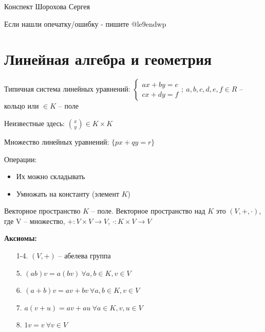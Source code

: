 \documentclass[12pt]{article}
\begin{document}
\begin{flushright}
    Конспект Шорохова Сергея

    Если нашли опечатку/ошибку - пишите @le9endwp
\end{flushright}

\tableofcontents
\newpage

\section{Линейная алгебра и геометрия}

Типичная система линейных уравнений: $\left\{\begin{array}{l}
    ax + by = e \\
    cx + dy = f
\end{array}\right.;\ a, b, c, d, e, f \in R$ -- кольцо или $\in K$ -- поле

Неизвестные здесь: ${x \choose y} \in K \times K$

Множество линейных уравнений: $\{ px + qy = r \}$

Операции:

\begin{itemize}
    \item Их можно складывать
    \item Умножать на константу (элемент $K$)
\end{itemize}

\vspace{5mm}

\begin{defin}{Векторное пространство}
    $K$ -- поле. Векторное пространство над $K$ это $(V, +, \cdot)$, где V -- множество, $+: V \times V \rightarrow V$, $\cdot: K \times V \rightarrow V$
\end{defin}

\vspace{5mm}

\textbf{Аксиомы:}

\begin{enumerate}
    \item[1-4.] $(V, +)$ -- абелева группа
    \item[5.] $(ab)v = a(bv)\ \forall a, b \in K, v \in V$
    \item[6.] $(a + b)v = av + bv\ \forall a, b \in K, v \in V$
    \item[7.] $a(v + u) = av + au\ \forall a \in K, v, u \in V$
    \item[8.] $1v = v\ \forall v \in V$
\end{enumerate}
\end{document}
